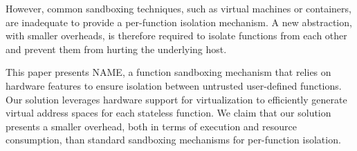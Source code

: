 \documentclass[12pt]{article}
\begin{document}
However, common sandboxing techniques, such as virtual machines or containers, are inadequate to provide a per-function isolation mechanism.
A new abstraction, with smaller overheads, is therefore required to isolate functions from each other and prevent them from hurting the underlying host.

This paper presents NAME, a function sandboxing mechanism that relies on hardware features to ensure isolation between untrusted user-defined functions.
Our solution leverages hardware support for virtualization to efficiently generate virtual address spaces for each stateless function.
We claim that our solution presents a smaller overhead, both in terms of execution and resource consumption, than standard sandboxing mechanisms for per-function isolation.
\end{document}

